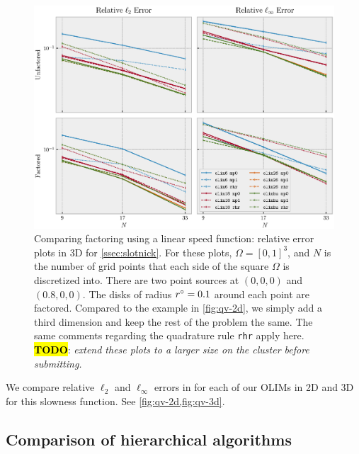 \documentclass[sisc-eikonal.tex]{subfiles}
\begin{document}
\begin{figure}[t]
  \centering
  \includegraphics[width=\linewidth]{qv_plots_3d.eps}
  \caption{Comparing factoring using a linear speed function: relative
    error plots in 3D for \cref{ssec:slotnick}. For these plots,
    $\Omega = [0, 1]^3$, and $N$ is the number of grid points that
    each side of the square $\Omega$ is discretized into. There are
    two point sources at $(0, 0, 0)$ and $(0.8, 0, 0)$. The disks of
    radius $r^\circ = 0.1$ around each point are factored. Compared to
    the example in \cref{fig:qv-2d}, we simply add a third dimension
    and keep the rest of the problem the same. The same comments
    regarding the quadrature rule \texttt{rhr} apply
    here. \hl{\textbf{TODO}}: \emph{extend these plots to a larger
      size on the cluster before submitting.}}\label{fig:qv-3d}
\end{figure}

We compare relative $\ell_2$ and $\ell_\infty$ errors in for each of
our OLIMs in 2D and 3D for this slowness function. See
\cref{fig:qv-2d,fig:qv-3d}.

\subsection{Comparison of hierarchical algorithms}\label{ssec:alg-comparison}
\end{document}
